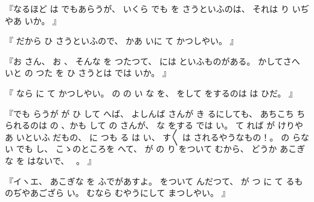 『なるほど
は
でもあらうが、
%
いくら
でも
を
さうといふのは、
%
それは
り
いぢやあ
いか。
』

『
だから
ひ
さうといふので、
%
かあ
いに
て
かつしやい。
』

『お
さん、
%
お
、
%
そんな
を
つたつて、
%
には
といふものがある。
%
かしてさへ
いと
の
つた
を
ひ
さうとは
では
いか。
』

『
なら
に
て
かつしやい。
%
の
の
い
な
を、
%
をして
をするのは
は
ひだ。
』

『でも
らうが
が
ひ
して
へば、
%
よしんば
さんが
き
るにしても、
%
あちこち
ち
られるのは
の
、かも
して
の
さんが、
%
な
をする
では
い。
%
て
れば
が
けりやあ
いといふ
だもの、
%
に
つも
る
は
い、
%
す〳〵
は
されるやうなもの！。
%
の
らない
でも
し、
%
こゝのところを
へて、
%
が
の
り
をついて
むから、
%
どうか
あこぎな
を
はないで、
%
\ 。
』

『イヽエ、
%
あこぎな
を
ふでがあすよ。
%
をついて
んだつて、
%
が
つ
に
て
るものぢやあござら
い。
%
むなら
むやうにして
まつしやい。
』

